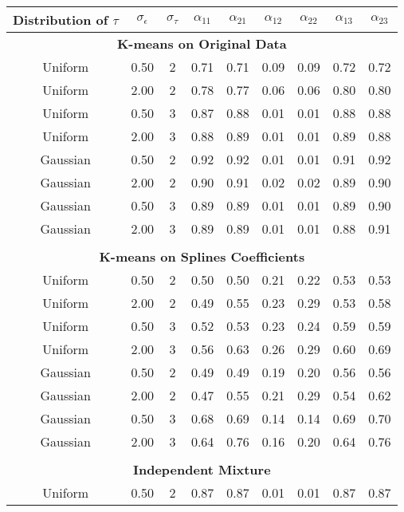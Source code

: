 \begin{table}[ht]
\begin{center}
\begin{tabular}{ccc|cccccc}
  \hline Distribution of $\tau$&$\sigma_{\epsilon}$&$\sigma_{\tau}$&$\alpha_{11}$&$\alpha_{21}$&$\alpha_{12}$&$\alpha_{22}$&$\alpha_{13}$&$\alpha_{23}$\\ \hline\multicolumn{9}{c}{\textbf{K-means on Original Data}}\\ Uniform & 0.50 &   2 & 0.71 & 0.71 & 0.09 & 0.09 & 0.72 & 0.72 \\ 
  Uniform & 2.00 &   2 & 0.78 & 0.77 & 0.06 & 0.06 & 0.80 & 0.80 \\ 
  Uniform & 0.50 &   3 & 0.87 & 0.88 & 0.01 & 0.01 & 0.88 & 0.88 \\ 
  Uniform & 2.00 &   3 & 0.88 & 0.89 & 0.01 & 0.01 & 0.89 & 0.88 \\ 
  Gaussian & 0.50 &   2 & 0.92 & 0.92 & 0.01 & 0.01 & 0.91 & 0.92 \\ 
  Gaussian & 2.00 &   2 & 0.90 & 0.91 & 0.02 & 0.02 & 0.89 & 0.90 \\ 
  Gaussian & 0.50 &   3 & 0.89 & 0.89 & 0.01 & 0.01 & 0.89 & 0.90 \\ 
  Gaussian & 2.00 &   3 & 0.89 & 0.89 & 0.01 & 0.01 & 0.88 & 0.91 \\ 
   \\ \multicolumn{9}{c}{\textbf{K-means on Splines Coefficients}}\\Uniform & 0.50 &   2 & 0.50 & 0.50 & 0.21 & 0.22 & 0.53 & 0.53 \\ 
  Uniform & 2.00 &   2 & 0.49 & 0.55 & 0.23 & 0.29 & 0.53 & 0.58 \\ 
  Uniform & 0.50 &   3 & 0.52 & 0.53 & 0.23 & 0.24 & 0.59 & 0.59 \\ 
  Uniform & 2.00 &   3 & 0.56 & 0.63 & 0.26 & 0.29 & 0.60 & 0.69 \\ 
  Gaussian & 0.50 &   2 & 0.49 & 0.49 & 0.19 & 0.20 & 0.56 & 0.56 \\ 
  Gaussian & 2.00 &   2 & 0.47 & 0.55 & 0.21 & 0.29 & 0.54 & 0.62 \\ 
  Gaussian & 0.50 &   3 & 0.68 & 0.69 & 0.14 & 0.14 & 0.69 & 0.70 \\ 
  Gaussian & 2.00 &   3 & 0.64 & 0.76 & 0.16 & 0.20 & 0.64 & 0.76 \\ 
   \\ \multicolumn{9}{c}{\textbf{Independent Mixture}}\\Uniform & 0.50 &   2 & 0.87 & 0.87 & 0.01 & 0.01 & 0.87 & 0.87 \\ 

\end{tabular}
\end{center}
\end{table}
